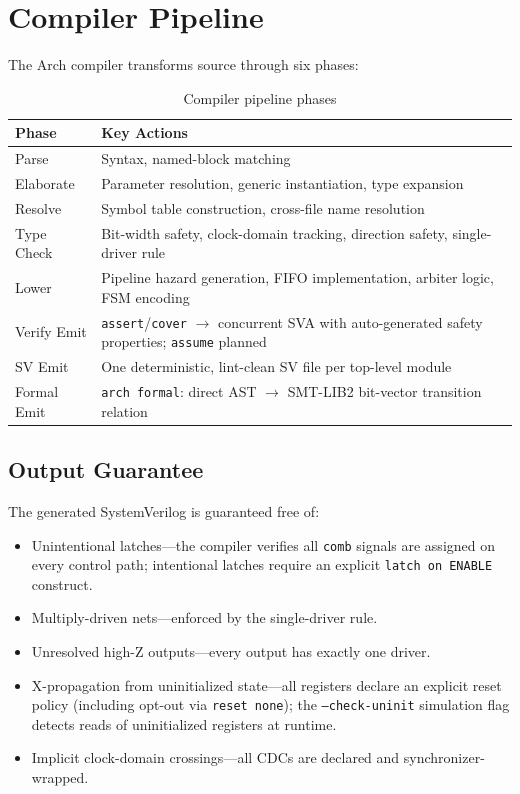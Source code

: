 \documentclass[11pt,twocolumn]{article}
\begin{document}
\section{Compiler Pipeline}\label{sec:compiler}

The Arch compiler transforms source through six phases:

\begin{table}[t]
\centering
\caption{Compiler pipeline phases}
\label{tab:compiler}
\small
\begin{tabular}{@{}lp{5cm}@{}}
\toprule
\textbf{Phase} & \textbf{Key Actions} \\
\midrule
Parse & Syntax, named-block matching \\
Elaborate & Parameter resolution, generic instantiation, type expansion \\
Resolve & Symbol table construction, cross-file name resolution \\
Type Check & Bit-width safety, clock-domain tracking, direction safety, single-driver rule \\
Lower & Pipeline hazard generation, FIFO implementation, arbiter logic, FSM encoding \\
Verify Emit & \texttt{assert}/\texttt{cover} $\to$ concurrent SVA with auto-generated safety properties; \texttt{assume} planned \\
SV Emit & One deterministic, lint-clean SV file per top-level module \\
Formal Emit & \texttt{arch formal}: direct AST $\to$ SMT-LIB2 bit-vector transition relation \\
\bottomrule
\end{tabular}
\end{table}

\subsection{Output Guarantee}

The generated SystemVerilog is guaranteed free of:
\begin{itemize}
\item Unintentional latches---the compiler verifies all \texttt{comb} signals are assigned on every control path; intentional latches require an explicit \texttt{latch on ENABLE} construct.
\item Multiply-driven nets---enforced by the single-driver rule.
\item Unresolved high-Z outputs---every output has exactly one driver.
\item X-propagation from uninitialized state---all registers declare an explicit reset policy (including opt-out via \texttt{reset none}); the \texttt{--check-uninit} simulation flag detects reads of uninitialized registers at runtime.
\item Implicit clock-domain crossings---all CDCs are declared and synchronizer-wrapped.
\end{itemize}
\end{document}

